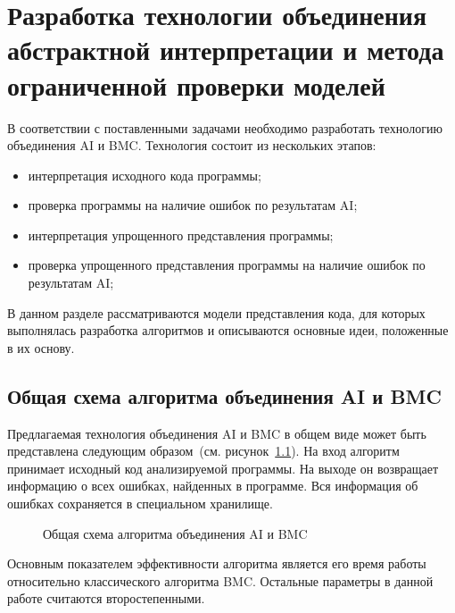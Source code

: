 \chapter{Разработка технологии объединения абстрактной интерпретации 
и метода ограниченной проверки моделей}
\label{chapter:algorithm}
В соответствии с поставленными задачами необходимо разработать технологию
объединения AI и BMC. Технология состоит из нескольких этапов:
\begin{itemize}
\item интерпретация исходного кода программы;
\item проверка программы на наличие ошибок по результатам AI;
\item интерпретация упрощенного представления программы;
\item проверка упрощенного представления программы на наличие ошибок по 
результатам AI;
\end{itemize}

В данном разделе рассматриваются модели представления кода, для которых 
выполнялась разработка алгоритмов и описываются основные идеи, положенные в их
основу.

\section{Общая схема алгоритма объединения AI и BMC}
Предлагаемая технология объединения AI и BMC в общем виде может быть 
представлена следующим образом~(см. рисунок~\ref{image:algorithmOverview}). На
вход алгоритм принимает исходный код анализируемой программы. На выходе он 
возвращает информацию о всех ошибках, найденных в программе. Вся информация
об ошибках сохраняется в специальном хранилище.

\begin{figure}[h!]
\caption{Общая схема алгоритма объединения AI и BMC}
\label{image:algorithmOverview}
\end{figure}

Основным показателем эффективности алгоритма является его время работы 
относительно классического алгоритма BMC. Остальные параметры в данной работе
считаются второстепенными.


